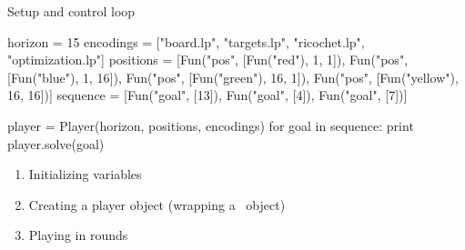 \begin{frame}[fragile]{Setup and control loop}
\scriptsize
\begin{semiverbatim}
 \alert<2>{horizon   = 15}
 \alert<2>{encodings = ["board.lp", "targets.lp", "ricochet.lp", "optimization.lp"]}
 \alert<2>{positions = [Fun("pos", [Fun("red"),     1,  1]),}
 \alert<2>{             Fun("pos", [Fun("blue"),    1, 16]),}
 \alert<2>{             Fun("pos", [Fun("green"),  16,  1]),}
 \alert<2>{             Fun("pos", [Fun("yellow"), 16, 16])]}
 \alert<2>{sequence  = [Fun("goal", [13]),}
 \alert<2>{             Fun("goal",  [4]),}
 \alert<2>{             Fun("goal",  [7])]}

 \alert<2>{player = Player(horizon, positions, encodings)}
\only<4>{>>}\only<-3,5->{  } \alert<2>{for goal in sequence:}
 \alert<2>{    print player.solve(goal)}
\end{semiverbatim}
\normalsize
\begin{enumerate}
\item<2-> Initializing variables
\item<3-> Creating a player object (wrapping a \clingo\ object)
\item<4-> Playing in rounds
\end{enumerate}
\end{frame}
